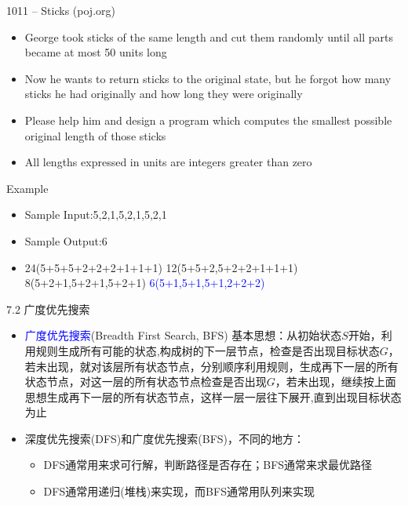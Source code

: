 \begin{frame}{1011 -- Sticks (poj.org)}
    \begin{itemize}
        \item George took sticks of the same length and cut them randomly until all parts became at most 50 units long
        \item Now he wants to return sticks to the original state, but he forgot how many sticks he had originally and how long they were originally
        \item Please help him and design a program which computes the smallest possible original length of those sticks
        \item All lengths expressed in units are integers greater than zero
    \end{itemize}
    \begin{exampleblock}{Example}
        \begin{itemize}
            \item Sample Input:5,2,1,5,2,1,5,2,1
            \item Sample Output:6
            \item 24(5+5+5+2+2+2+1+1+1) 12(5+5+2,5+2+2+1+1+1) 8(5+2+1,5+2+1,5+2+1) \textcolor{blue}{6(5+1,5+1,5+1,2+2+2)}
        \end{itemize}
    \end{exampleblock}
\end{frame}    
\begin{frame}{7.2 广度优先搜索}
    \begin{itemize}
        \item \textcolor{blue}{广度优先搜索}(Breadth First Search, BFS) 基本思想：从初始状态$S$开始，利用规则生成所有可能的状态,构成树的下一层节点，检查是否出现目标状态$G$，若未出现，就对该层所有状态节点，分别顺序利用规则，生成再下一层的所有状态节点，对这一层的所有状态节点检查是否出现$G$，若未出现，继续按上面思想生成再下一层的所有状态节点，这样一层一层往下展开,直到出现目标状态为止
        \item 深度优先搜索(DFS)和广度优先搜索(BFS)，不同的地方：
        \begin{itemize}
            \item DFS通常用来求可行解，判断路径是否存在；BFS通常来求最优路径
            \item DFS通常用递归(堆栈)来实现，而BFS通常用队列来实现
        \end{itemize}
    \end{itemize}
\end{frame}
